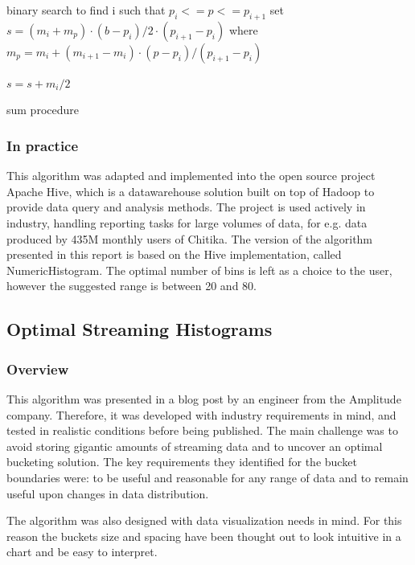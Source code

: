 \documentclass[12pt]{article}
\begin{document}
	\begin{algorithm}
		\label{sum}

		binary search to find i such that $p_i <= p <= p_{i+1}$\;
		set $s = (m_i + m_p) \cdot (b - p_i) / 2 \cdot (p_{i+1} - p_i) $\;
		where $m_p = m_i + (m_{i+1} - m_i) \cdot (p - p_i) / (p_{i+1} - p_i)$\;

		$s = s + m_i / 2$\;
		\caption{sum procedure}
	\end{algorithm}

	\subsubsection{In practice}
	This algorithm was adapted and implemented into the open source project Apache 
	Hive\cite{Thusoo:2009:HWS:1687553.1687609}, which is a datawarehouse solution 
	built on top of Hadoop to provide data query and analysis methods. The project 
	is used actively in industry, handling reporting tasks for large volumes of data,
	for e.g. data produced by 435M monthly users of Chitika\cite{HivePoweredBy}.
	The version of the algorithm presented in this report is based on the Hive 
	implementation, called NumericHistogram\cite{HiveImplementation}. The optimal 
	number of bins is left as a choice to the user, however the suggested range 
	is between 20 and 80.


	\subsection{Optimal Streaming Histograms}
	\subsubsection{Overview}
	This algorithm was presented in a blog post\cite{OSHistograms} 
	by an engineer from the Amplitude company. Therefore, it was developed 
	with industry requirements in mind, and tested in realistic conditions 
	before being published. The main challenge was to avoid storing gigantic 
	amounts of streaming data and to uncover an optimal bucketing solution.
	The key requirements they identified for the bucket boundaries were:
	to be useful and reasonable for any range of data and to remain 
	useful upon changes in data distribution.
	
	The algorithm was also designed with data visualization needs in mind. 
	For this reason the buckets size and spacing have been thought out to 
	look intuitive in a chart and be easy to interpret.
\end{document}
